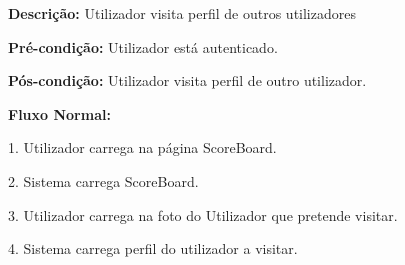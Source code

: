 \textbf{Descrição:} Utilizador visita perfil de outros utilizadores

\textbf{Pré-condição:} Utilizador está autenticado.

\textbf{Pós-condição:} Utilizador visita perfil de outro utilizador.

\textbf{Fluxo Normal:}

1. Utilizador carrega na página ScoreBoard.

2. Sistema carrega ScoreBoard.

3. Utilizador carrega na foto do Utilizador que pretende visitar.

4. Sistema carrega perfil do utilizador a visitar.